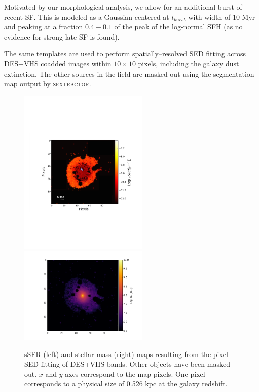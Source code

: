 Motivated by our morphological analysis, we allow for an additional burst of recent SF. This is modeled as a Gaussian centered at $t_{burst}$ with width of 10 Myr and peaking at a fraction $0.4-0.1$ of the peak of the log-normal SFH (as no evidence for strong late SF is found).

The same templates are used to perform spatially--resolved SED fitting across DES+VHS coadded images within $10\times10$ pixels, including the galaxy dust extinction. The other sources in the field are masked out using the segmentation map output by \textsc{sextractor}.

\begin{figure}
\includegraphics[width=0.55\textwidth]{./chapters/chapter3/Figures/f4a.pdf}\hspace{-0.55cm}\vspace{0.5cm}\includegraphics[width=0.55\textwidth]{./chapters/chapter3/Figures/smass_map_masked.png}
\caption{sSFR (left) and stellar mass (right) maps resulting from the pixel SED fitting of DES+VHS bands. Other objects have been masked out. $x$ and $y$ axes correspond to the map pixels. One pixel corresponds to a physical size of 0.526 kpc at the galaxy redshift. }\label{smass_map}\end{figure}

